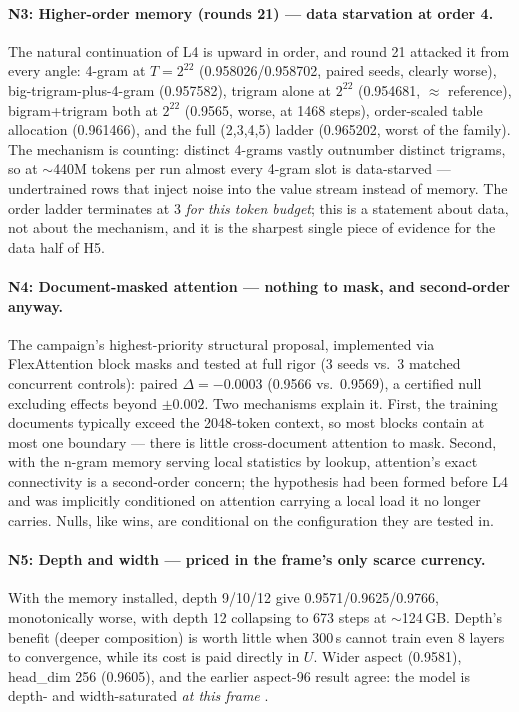 \documentclass{article}
\begin{document}
\paragraph{N3: Higher-order memory (rounds 21) --- data starvation at order 4.}
The natural continuation of L4 is upward in order, and round 21 attacked it from every angle: 4-gram at $T = 2^{22}$ (0.958026/0.958702, paired seeds, clearly worse), big-trigram-plus-4-gram (0.957582), trigram alone at $2^{22}$ (0.954681, $\approx$ reference), bigram+trigram both at $2^{22}$ (0.9565, worse, at 1468 steps), order-scaled table allocation (0.961466), and the full (2,3,4,5) ladder (0.965202, worst of the family). The mechanism is counting: distinct 4-grams vastly outnumber distinct trigrams, so at $\sim$440M tokens per run almost every 4-gram slot is data-starved --- undertrained rows that inject noise into the value stream instead of memory. The order ladder terminates at 3 \emph{for this token budget}; this is a statement about data, not about the mechanism, and it is the sharpest single piece of evidence for the data half of H5.

\paragraph{N4: Document-masked attention --- nothing to mask, and second-order anyway.}
The campaign's highest-priority structural proposal, implemented via FlexAttention block masks \cite{dong2024flex} and tested at full rigor (3 seeds vs.\ 3 matched concurrent controls): paired $\Delta = -0.0003$ (0.9566 vs.\ 0.9569), a certified null excluding effects beyond $\pm 0.002$. Two mechanisms explain it. First, the training documents typically exceed the 2048-token context, so most blocks contain at most one boundary --- there is little cross-document attention to mask. Second, with the n-gram memory serving local statistics by lookup, attention's exact connectivity is a second-order concern; the hypothesis had been formed before L4 and was implicitly conditioned on attention carrying a local load it no longer carries. Nulls, like wins, are conditional on the configuration they are tested in.

\paragraph{N5: Depth and width --- priced in the frame's only scarce currency.}
With the memory installed, depth 9/10/12 give 0.9571/0.9625/0.9766, monotonically worse, with depth 12 collapsing to 673 steps at $\sim$124\,GB. Depth's benefit (deeper composition) is worth little when 300\,s cannot train even 8 layers to convergence, while its cost is paid directly in $U$. Wider aspect (0.9581), head\_dim 256 (0.9605), and the earlier aspect-96 result agree: the model is depth- and width-saturated \emph{at this frame} \cite{hoffmann2022chinchilla}.
\end{document}
